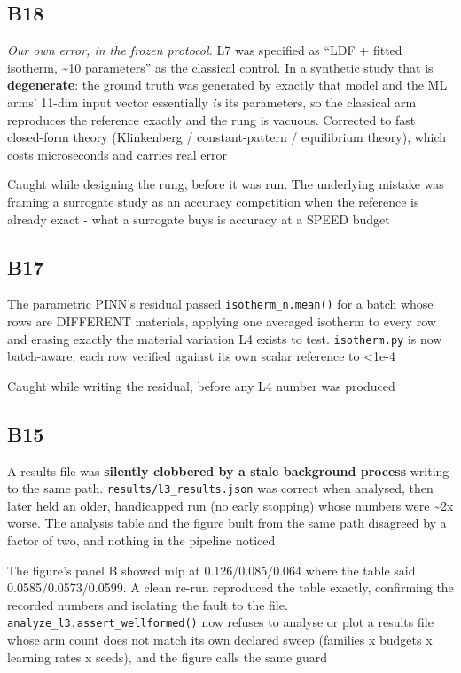 \documentclass[10pt]{article}
\begin{document}
\subsection*{B18}\label{led:B18}
\begin{description}[leftmargin=0pt,itemsep=1pt]
\item[Defect.] \emph{Our own error, in the frozen protocol.} L7 was specified as ``LDF + fitted isotherm, \textasciitilde{}10 parameters'' as the classical control. In a synthetic study that is \textbf{degenerate}: the ground truth was generated by exactly that model and the ML arms' 11-dim input vector essentially \emph{is} its parameters, so the classical arm reproduces the reference exactly and the rung is vacuous. Corrected to fast closed-form theory (Klinkenberg / constant-pattern / equilibrium theory), which costs microseconds and carries real error
\item[How it was caught.] Caught while designing the rung, before it was run. The underlying mistake was framing a surrogate study as an accuracy competition when the reference is already exact - what a surrogate buys is accuracy at a SPEED budget
\end{description}
\subsection*{B17}\label{led:B17}
\begin{description}[leftmargin=0pt,itemsep=1pt]
\item[Defect.] The parametric PINN's residual passed \texttt{isotherm\_n.mean()} for a batch whose rows are DIFFERENT materials, applying one averaged isotherm to every row and erasing exactly the material variation L4 exists to test. \texttt{isotherm.py} is now batch-aware; each row verified against its own scalar reference to <1e-4
\item[How it was caught.] Caught while writing the residual, before any L4 number was produced
\end{description}
\subsection*{B15}\label{led:B15}
\begin{description}[leftmargin=0pt,itemsep=1pt]
\item[Defect.] A results file was \textbf{silently clobbered by a stale background process} writing to the same path. \texttt{results/l3\_results.json} was correct when analysed, then later held an older, handicapped run (no early stopping) whose numbers were \textasciitilde{}2x worse. The analysis table and the figure built from the same path disagreed by a factor of two, and nothing in the pipeline noticed
\item[How it was caught.] The figure's panel B showed mlp at 0.126/0.085/0.064 where the table said 0.0585/0.0573/0.0599. A clean re-run reproduced the table exactly, confirming the recorded numbers and isolating the fault to the file. \texttt{analyze\_l3.assert\_wellformed()} now refuses to analyse or plot a results file whose arm count does not match its own declared sweep (families x budgets x learning rates x seeds), and the figure calls the same guard
\end{description}
\end{document}
